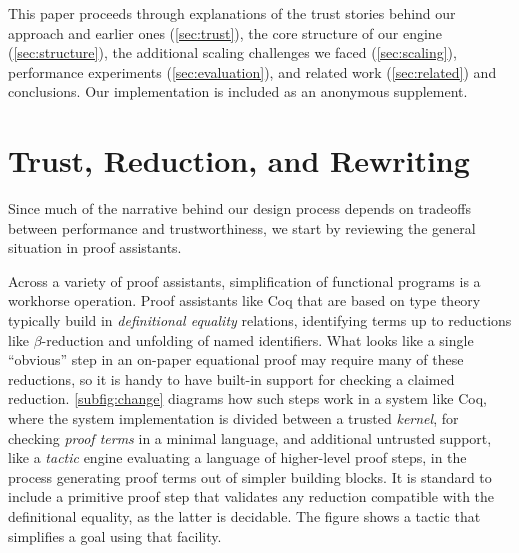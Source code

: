 This paper proceeds through explanations of the trust stories behind our approach and earlier ones (\autoref{sec:trust}), the core structure of our engine (\autoref{sec:structure}), the additional scaling challenges we faced (\autoref{sec:scaling}), performance experiments (\autoref{sec:evaluation}), and related work (\autoref{sec:related}) and conclusions.
Our implementation is included as an anonymous supplement.


\section{Trust, Reduction, and Rewriting} \label{sec:trust}

Since much of the narrative behind our design process depends on tradeoffs between performance and trustworthiness, we start by reviewing the general situation in proof assistants.

Across a variety of proof assistants, simplification of functional programs is a workhorse operation.
Proof assistants like Coq that are based on type theory typically build in \emph{definitional equality} relations, identifying terms up to reductions like $\beta$-reduction and unfolding of named identifiers.
What looks like a single ``obvious'' step in an on-paper equational proof may require many of these reductions, so it is handy to have built-in support for checking a claimed reduction.
\autoref{subfig:change} diagrams how such steps work in a system like Coq, where the system implementation is divided between a trusted \emph{kernel}, for checking \emph{proof terms} in a minimal language, and additional untrusted support, like a \emph{tactic} engine evaluating a language of higher-level proof steps, in the process generating proof terms out of simpler building blocks.
It is standard to include a primitive proof step that validates any reduction compatible with the definitional equality, as the latter is decidable.
The figure shows a tactic that simplifies a goal using that facility.

